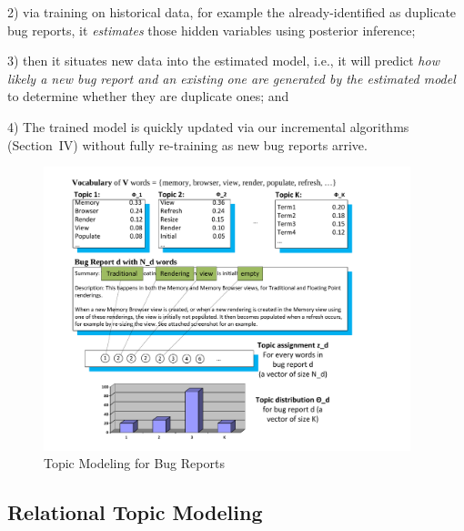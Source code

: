 2) via training on historical data, for example the already-identified
   as duplicate bug reports, it {\em estimates} those hidden variables
   using posterior inference;

3) then it situates new data into the estimated model, i.e., it will
   predict {\em how likely a new bug report and an existing one are
   generated by the estimated model} to determine whether they are
   duplicate ones; and

4) The trained model is quickly updated via our incremental algorithms
   (Section~IV) without fully re-training as new bug reports arrive.




\begin{figure}[t]
\centering
\includegraphics[width=4.2in]{irtm4}
\caption{Topic Modeling for Bug Reports~\cite{lda}}
\label{topicmodel}
\end{figure}


\subsection{Relational Topic Modeling}


